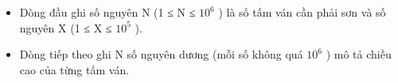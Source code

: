 \begin{itemize}
	\item     Dòng đầu ghi số nguyên N (1 ≤ N ≤ $10^{6}$    ) là số tấm ván cần phải sơn và số nguyên X (1 ≤ X ≤ $10^{5}$    ).   
	\item     Dòng tiếp theo ghi N số nguyên dương (mỗi số không quá $10^{6}$    ) mô tả chiều cao của từng tấm ván.   
\end{itemize}